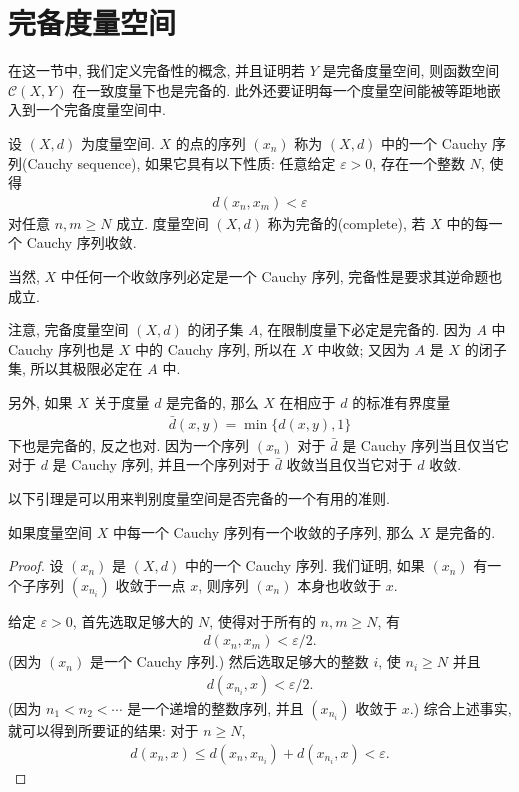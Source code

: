 \documentclass[../../main.tex]{subfiles}
\begin{document}
\section{完备度量空间}\label{section:ch07-complete-metric}

在这一节中, 我们定义完备性的概念, 并且证明若 $Y$ 是完备度量空间, 则函数空间 $\mathcal{C}(X,Y)$ 在一致度量下也是完备的. 此外还要证明每一个度量空间能被等距地嵌入到一个完备度量空间中.

\begin{definition}\label{definition:ch07-cauchy-complete}
设 $(X,d)$ 为度量空间. $X$ 的点的序列 $(x_n)$ 称为 $(X,d)$ 中的一个 Cauchy 序列(Cauchy sequence), 如果它具有以下性质: 任意给定 $\varepsilon>0$, 存在一个整数 $N$, 使得
\begin{align*}
d(x_n,x_m)<\varepsilon
\end{align*}
对任意 $n,m\geqslant N$ 成立. 度量空间 $(X,d)$ 称为完备的(complete), 若 $X$ 中的每一个 Cauchy 序列收敛.
\end{definition}

当然, $X$ 中任何一个收敛序列必定是一个 Cauchy 序列, 完备性是要求其逆命题也成立.

注意, 完备度量空间 $(X,d)$ 的闭子集 $A$, 在限制度量下必定是完备的. 因为 $A$ 中 Cauchy 序列也是 $X$ 中的 Cauchy 序列, 所以在 $X$ 中收敛; 又因为 $A$ 是 $X$ 的闭子集, 所以其极限必定在 $A$ 中.

另外, 如果 $X$ 关于度量 $d$ 是完备的, 那么 $X$ 在相应于 $d$ 的标准有界度量
\begin{align*}
\bar{d}(x,y)=\min\{d(x,y),1\}
\end{align*}
下也是完备的, 反之也对. 因为一个序列 $(x_n)$ 对于 $\bar{d}$ 是 Cauchy 序列当且仅当它对于 $d$ 是 Cauchy 序列, 并且一个序列对于 $\bar{d}$ 收敛当且仅当它对于 $d$ 收敛.

以下引理是可以用来判别度量空间是否完备的一个有用的准则.

\begin{lemma}\label{lemma:ch07-cauchy-subsequence}
如果度量空间 $X$ 中每一个 Cauchy 序列有一个收敛的子序列, 那么 $X$ 是完备的.
\end{lemma}

\begin{proof}
设 $(x_n)$ 是 $(X,d)$ 中的一个 Cauchy 序列. 我们证明, 如果 $(x_n)$ 有一个子序列 $(x_{n_i})$ 收敛于一点 $x$, 则序列 $(x_n)$ 本身也收敛于 $x$.

给定 $\varepsilon>0$, 首先选取足够大的 $N$, 使得对于所有的 $n,m\geqslant N$, 有
\begin{align*}
d(x_n,x_m)<\varepsilon/2.
\end{align*}
(因为 $(x_n)$ 是一个 Cauchy 序列.) 然后选取足够大的整数 $i$, 使 $n_i\geqslant N$ 并且
\begin{align*}
d(x_{n_i},x)<\varepsilon/2.
\end{align*}
(因为 $n_1<n_2<\cdots$ 是一个递增的整数序列, 并且 $(x_{n_i})$ 收敛于 $x$.) 综合上述事实, 就可以得到所要证的结果: 对于 $n\geqslant N$,
\begin{align*}
d(x_n,x)\leqslant d(x_n,x_{n_i})+d(x_{n_i},x)<\varepsilon.
\end{align*}
\end{proof}
\end{document}
